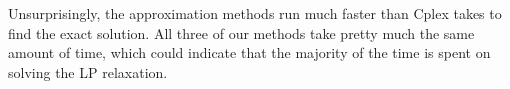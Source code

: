 \documentclass[11pt,a4paper,english]{article}
\begin{document}
 Unsurprisingly, the approximation methods run much faster than Cplex takes to find the exact solution. All three of our methods take pretty much the same amount of time,
  which could indicate that the majority of the time is spent on solving the LP relaxation.

\clearpage


\end{document}
